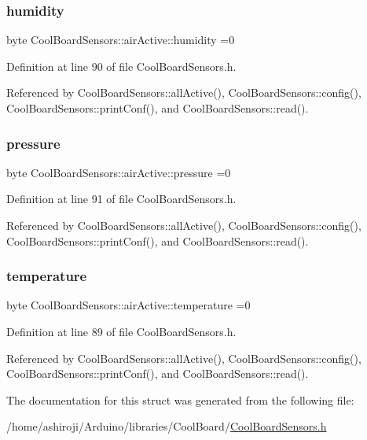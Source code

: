 \subsubsection{\texorpdfstring{humidity}{humidity}}
{\footnotesize\ttfamily byte Cool\+Board\+Sensors\+::air\+Active\+::humidity =0}



Definition at line 90 of file Cool\+Board\+Sensors.\+h.



Referenced by Cool\+Board\+Sensors\+::all\+Active(), Cool\+Board\+Sensors\+::config(), Cool\+Board\+Sensors\+::print\+Conf(), and Cool\+Board\+Sensors\+::read().

\mbox{\label{structCoolBoardSensors_1_1airActive_ab200826a70d1dc9945f5efb6b9c732ed}} 
\subsubsection{\texorpdfstring{pressure}{pressure}}
{\footnotesize\ttfamily byte Cool\+Board\+Sensors\+::air\+Active\+::pressure =0}



Definition at line 91 of file Cool\+Board\+Sensors.\+h.



Referenced by Cool\+Board\+Sensors\+::all\+Active(), Cool\+Board\+Sensors\+::config(), Cool\+Board\+Sensors\+::print\+Conf(), and Cool\+Board\+Sensors\+::read().

\mbox{\label{structCoolBoardSensors_1_1airActive_a9a6633c426b0508e30ebc1832ec6d745}} 
\subsubsection{\texorpdfstring{temperature}{temperature}}
{\footnotesize\ttfamily byte Cool\+Board\+Sensors\+::air\+Active\+::temperature =0}



Definition at line 89 of file Cool\+Board\+Sensors.\+h.



Referenced by Cool\+Board\+Sensors\+::all\+Active(), Cool\+Board\+Sensors\+::config(), Cool\+Board\+Sensors\+::print\+Conf(), and Cool\+Board\+Sensors\+::read().



The documentation for this struct was generated from the following file\+:\begin{DoxyCompactItemize}
\item 
/home/ashiroji/\+Arduino/libraries/\+Cool\+Board/\hyperlink{CoolBoardSensors_8h}{Cool\+Board\+Sensors.\+h}\end{DoxyCompactItemize}
